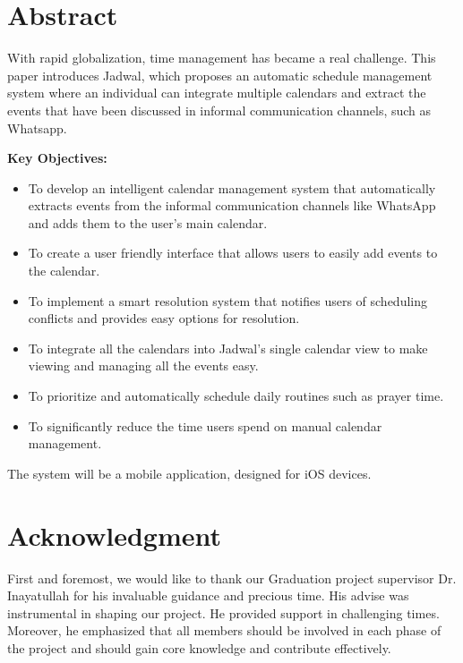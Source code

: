 \documentclass[12pt,a4paper]{report}
\begin{document}
\begin{singlespace}

    \chapter*{Abstract}

    \begin{justify}
        With rapid globalization, time management has became a real challenge. This paper introduces Jadwal, which proposes an automatic schedule management system where an individual can integrate multiple calendars and extract the events that have been discussed in informal communication channels, such as Whatsapp.

        \textbf{Key Objectives:}
        \begin{itemize}
            \item To develop an intelligent calendar management system that automatically extracts events from the informal communication channels like WhatsApp and adds them to the user's main calendar.
            \item To create a user friendly interface that allows users to easily add events to the calendar.
            \item To implement a smart resolution system that notifies users of scheduling conflicts and provides easy options for resolution.
            \item To integrate all the calendars into Jadwal's single calendar view to make viewing and managing all the events easy.
            \item To prioritize and automatically schedule daily routines such as prayer time.
            \item To significantly reduce the time users spend on manual calendar management.
        \end{itemize}


        \begin{center}
            The system will be a mobile application, designed for iOS devices.
        \end{center}
    \end{justify}

    \chapter*{Acknowledgment}

    \begin{justify}
        First and foremost, we would like to thank our Graduation project supervisor Dr. Inayatullah for his invaluable guidance and precious time. His advise was instrumental in shaping our project. He provided support in challenging times. Moreover, he emphasized that all members should be involved in each phase of the project and should gain core knowledge and contribute effectively.


\end{justify}
\end{singlespace}
\end{document}
